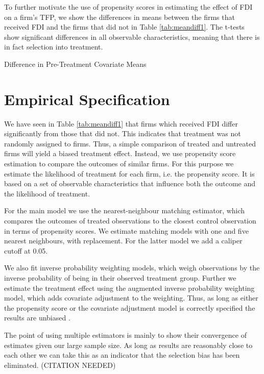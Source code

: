\documentclass[a4paper,11pt]{scrartcl}
\begin{document}
To further motivate the use of propensity scores in estimating the effect of FDI on a firm's TFP, we show the differences in means between the firms that received FDI and the firms that did not in Table \ref{tab:meandiff1}. The t-tests show significant differences in all observable characteristics, meaning that there is in fact selection into treatment.

\begin{table}[hbtp!]
	\centering
	\caption{Difference in Pre-Treatment Covariate Means}
	
	\label{tab:meandiff1}
\end{table}

\newpage
\section{Empirical Specification}


We have seen in Table \ref{tab:meandiff1} that firms which received FDI differ significantly from those that did not. This indicates that treatment was not randomly assigned to firms. Thus, a simple comparison of treated and untreated firms will yield a biased treatment effect. Instead, we use propensity score estimation to compare the outcomes of similar firms. For this purpose we estimate the  likelihood of treatment for each firm, i.e. the propensity score. It is based on a set of observable characteristics that influence both the outcome and the likelihood of treatment. 

For the main model we use the nearest-neighbour matching estimator, which compares the outcomes of treated observations to the closest control observation in terms of propensity scores. We estimate matching models  with one and five nearest neighbours, with replacement. For the latter model we add a caliper cutoff at 0.05. 

We also fit inverse probability weighting models, which weigh observations by the inverse probability of being in their observed treatment group. Further we estimate the treatment effect using the augmented inverse probability weighting model, which adds covariate adjustment to the weighting. Thus, as long as either the propensity score or the covariate adjustment model is correctly specified the results are unbiased \citep[][p.~393]{imbens2015}. 

The point of using multiple estimators is mainly to show their convergence of estimates given our large sample size. As long as results are reasonably close to each other we can take this as an indicator that the selection bias has been eliminated. (CITATION NEEDED)
\end{document}
